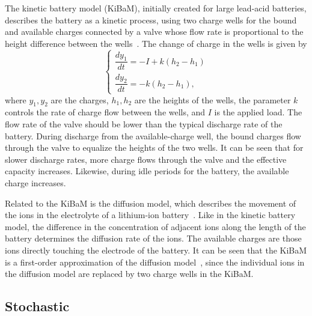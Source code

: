 \documentclass[../zhang_thesis.tex]{subfiles}
\begin{document}
The kinetic battery model (KiBaM), initially created for large lead-acid batteries, describes the battery as a kinetic process, using two charge wells for the bound and available charges connected by a valve whose flow rate is proportional to the height difference between the wells~\cite{manwell93}. The change of charge in the wells is given by
\begin{equation}
    \begin{cases}
        \dfrac{dy_1}{dt} = -I + k \left( h_2 - h_1 \right) \\
        \dfrac{dy_2}{dt} = -k \left( h_2 - h_1 \right),
    \end{cases}
    \label{eq:kibam}
\end{equation}
where $y_1,y_2$ are the charges, $h_1,h_2$ are the heights of the wells, the parameter $k$ controls the rate of charge flow between the wells, and $I$ is the applied load. The flow rate of the valve should be lower than the typical discharge rate of the battery. During discharge from the available-charge well, the bound charges flow through the valve to equalize the heights of the two wells. It can be seen that for slower discharge rates, more charge flows through the valve and the effective
capacity increases. Likewise, during idle periods for the battery, the available charge increases.

Related to the KiBaM is the diffusion model, which describes the movement of the ions in the electrolyte of a lithium-ion battery~\cite{rakhmatov01}. Like in the kinetic battery model, the difference in the concentration of adjacent ions along the length of the battery determines the diffusion rate of the ions. The available charges are those ions directly touching the electrode of the battery. It can be seen that the KiBaM is a first-order approximation of the diffusion
model~\cite{jongerden09}, since the individual ions in the diffusion model are replaced by two charge wells in the KiBaM.

\subsection{Stochastic}
\end{document}
